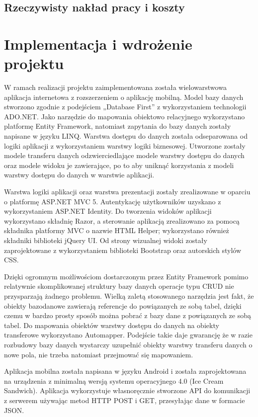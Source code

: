 \documentclass[a4paper,11pt]{article}
\begin{document}
\subsection{Rzeczywisty nakład pracy i koszty} 
\section{Implementacja i wdrożenie projektu}
W ramach realizacji projektu zaimplementowana została wielowarstwowa aplikacja internetowa z rozszerzeniem o aplikację mobilną. Model bazy danych stworzono zgodnie z podejściem „Database First” z wykorzystaniem technologii ADO.NET. Jako narzędzie do mapowania obiektowo relacyjnego wykorzystano platformę Entity Framework, natomiast zapytania do bazy danych zostały napisane w języku LINQ. Warstwa dostępu do danych została odseparowana od logiki aplikacji z wykorzystaniem warstwy logiki biznesowej. Utworzone zostały modele transferu danych odzwierciedlające modele warstwy dostępu do danych oraz modele widoku je zawierające, po to aby uniknąć korzystania z modeli warstwy dostępu do danych w warstwie aplikacji.

Warstwa logiki aplikacji oraz warstwa prezentacji zostały zrealizowane w oparciu o platformę ASP.NET MVC 5. Autentykację użytkowników uzyskano z wykorzystaniem ASP.NET Identity. Do tworzenia widoków aplikacji wykorzystano składnię Razor, a sterowanie aplikacją zrealizowano za pomocą składnika platformy MVC o nazwie HTML Helper; wykorzystano również składniki biblioteki jQuery UI. Od strony wizualnej widoki zostały zaprojektowane z wykorzystaniem biblioteki Bootstrap oraz autorskich stylów CSS.

Dzięki ogromnym możliwościom dostarczonym przez Entity Framework pomimo relatywnie skomplikowanej struktury bazy danych operacje typu CRUD nie przysparzają żadnego problemu. Wielką zaletą stosowanego narzędzia jest fakt, że obiekty bazodanowe zawierają referencje do powiązanych ze sobą tabel, dzięki czemu w bardzo prosty sposób można pobrać z bazy dane z powiązanych ze sobą tabel. Do mapowania obiektów warstwy dostępu do danych na obiekty transferowe wykorzystano Automapper. Podejście takie daje gwarancję że w razie rozbudowy bazy danych wystarczy uzupełnić obiekty warstwy transferu danych o nowe pola, nie trzeba natomiast przejmować się mapowaniem.

Aplikacja mobilna została napisana w języku Android i została zaprojektowana na urządzenia z minimalną wersją systemu operacyjnego 4.0 (Ice Cream Sandwich). Aplikacja wykorzystuje własnoręcznie stworzone API do komunikacji z serwerem używając metod HTTP POST i GET, przesyłając dane w formacie JSON.
\end{document}
